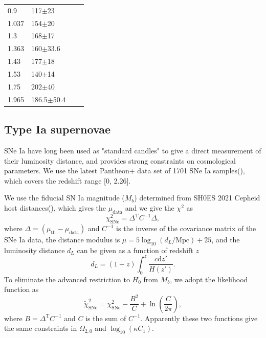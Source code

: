 \documentclass[twocolumn]{aastex631}
\begin{document}
\begin{table}[htbp]
\begin{tabular}{llll}
         0.9 & 117$\pm$23 & \cite{PhysRevD.71.123001} \\
         1.037 & 154$\pm$20 & \cite{M.Moresco_2012} \\
         1.3 & 168$\pm$17 & \cite{PhysRevD.71.123001} \\
         1.363 & 160$\pm$33.6 & \cite{10.1093/mnrasl/slv037} \\
         1.43 & 177$\pm$18 & \cite{PhysRevD.71.123001} \\
         1.53 & 140$\pm$14 & \cite{PhysRevD.71.123001} \\
         1.75 & 202$\pm$40 & \cite{PhysRevD.71.123001} \\
         1.965 & 186.5$\pm$50.4 & \cite{10.1093/mnrasl/slv037} \\
         \hline    
      \end{tabular}
      \label{tab:1}
   \end{table}

\subsection{Type Ia supernovae}

   SNe Ia have long been used as "standard candles" to give a direct
   measurement of their luminosity distance, and provides strong constraints
   on cosmological parameters. We use the latest Pantheon+ data set of 1701 
   SNe Ia samples(\cite{Scolnic_2022}), which covers the redshift range [0, 2.26].
   
   We use the fiducial SN Ia magnitude ($M_b$) determined from SH0ES 2021 Cepheid 
   host distances(\cite{Riess_2022}), which gives the $\mu_{\text{data}}$ and we 
   give the $\chi^2$ as 
   \begin{equation}
      \chi_{\text{SNe}}^2=\Delta^{\text{T}}C^{-1}\Delta,
   \end{equation}
   where $\Delta=(\mu_{\text{th}}-\mu_{\text{data}})$ and $C^{-1}$ is the inverse of the
   covariance matrix of the SNe Ia data, the distance modulus is $\mu=5\log_{10}(d_L/\text{Mpc})+25$, and the
   luminosity distance $d_L$ can be given as a function of redshift $z$
   \begin{equation}
      d_L=(1+z)\int_0^z\frac{c\mathrm{d}z'}{H(z')}.\label{eq:15}
   \end{equation}
   To eliminate the advanced restriction to $H_0$ from $M_b$, we adopt
   the likelihood function as
   \begin{equation}
      \widetilde{\chi}_{\text{SNe}}^2=\chi_{\text{SNe}}^2-\frac{B^2}{C}+\ln\left(\frac{C}{2\pi}\right),
   \end{equation}
   where $B=\Delta^{\text{T}}C^{-1}$ and $C$ is the sum of $C^{-1}$.
   Apparently these two functions give the same constraints in $\Omega_{2,0}$ and
   $\log_{10}(\kappa C_1)$.
\end{document}
